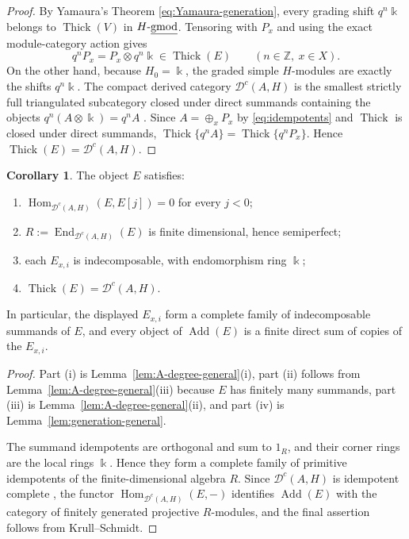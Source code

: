 \documentclass[11pt]{article}
\theoremstyle{definition}
\newtheorem{cor}[thm]{Corollary}
\numberwithin{equation}{section}
\def\udgmod{\mbox{-\underline{gmod}}}
\newcommand{\kk}{\Bbbk}
\newcommand{\Dc}{\mathcal{D}^c(A,H)}
\newcommand{\Hom}{\operatorname{Hom}}
\newcommand{\End}{\operatorname{End}}
\newcommand{\thick}{\operatorname{Thick}}
\newcommand{\add}{\operatorname{Add}}
\begin{document}
\begin{proof}
By Yamaura's Theorem \eqref{eq:Yamaura-generation}, every grading shift $q^n\kk$ belongs to $\thick(V)$ in $H\udgmod$.  Tensoring with $P_x$ and using the exact module-category action gives
\[
q^nP_x=P_x\otimes q^n\kk\in\thick(E)
\qquad(n\in\mathbb Z,\ x\in X).
\]
On the other hand, because $H_0=\kk$, the graded simple $H$-modules are exactly the shifts $q^n\kk$. The compact derived category $\Dc$ is the smallest strictly full triangulated subcategory closed under direct summands containing the objects $q^n(A\otimes\kk)=q^nA$ \cite[Proposition 7.6 and Corollary 7.15]{QYHopf}.  Since $A=\oplus_x P_x$ by \eqref{eq:idempotents} and $\thick$ is closed under direct summands, $\thick\{q^nA\}=\thick\{q^nP_x\}$.  Hence $\thick(E)=\Dc$.
\end{proof}

\begin{cor}\label{cor:positive-data-general}
The object $E$ satisfies:
\begin{enumerate}
\item[(i)] $\Hom_{\Dc}(E,E[j])=0$ for every $j<0$;
\item[(ii)] $R:=\End_{\Dc}(E)$ is finite dimensional, hence semiperfect;
\item[(iii)] each $E_{x,i}$ is indecomposable, with endomorphism ring $\kk$;
\item[(iv)] $\thick(E)=\Dc$.
\end{enumerate}
In particular, the displayed $E_{x,i}$ form a complete family of
indecomposable summands of $E$, and every object of $\add(E)$ is a finite
direct sum of copies of the $E_{x,i}$.
\end{cor}

\begin{proof}
Part (i) is Lemma~\ref{lem:A-degree-general}(i), part (ii) follows from
Lemma~\ref{lem:A-degree-general}(iii) because $E$ has finitely many summands,
part (iii) is Lemma~\ref{lem:A-degree-general}(ii), and part (iv) is
Lemma~\ref{lem:generation-general}.

The summand idempotents are orthogonal and sum to $1_R$, and their corner
rings are the local rings $\kk$.  Hence they form a complete family of
primitive idempotents of the finite-dimensional algebra $R$.  Since $\Dc$ is
idempotent complete \cite[Corollary~7.15]{QYHopf}, the functor
$\Hom_{\Dc}(E,-)$ identifies $\add(E)$ with the category of finitely generated
projective $R$-modules, and the final assertion follows from Krull--Schmidt.
\end{proof}
\end{document}
